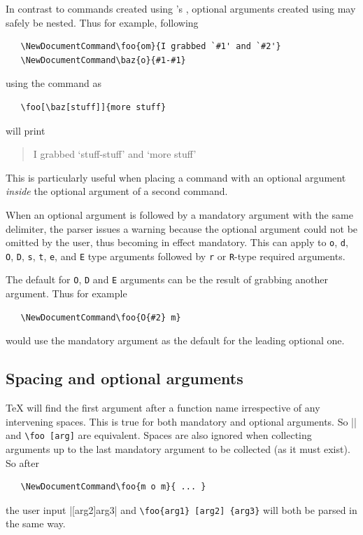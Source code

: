 \documentclass{ltxguide}
\begin{document}
In contrast to commands created using \LaTeXe{}'s , optional
arguments created using  may safely be nested. Thus for
example, following
\begin{verbatim}
   \NewDocumentCommand\foo{om}{I grabbed `#1' and `#2'}
   \NewDocumentCommand\baz{o}{#1-#1}
\end{verbatim}
using the command as
\begin{verbatim}
   \foo[\baz[stuff]]{more stuff}
\end{verbatim}
will print
\begin{quote}
I grabbed `stuff-stuff' and `more stuff'
\end{quote}
This is particularly useful when placing a command with an optional argument
\emph{inside} the optional argument of a second command.

When an optional argument is followed by a mandatory argument with the same
delimiter, the parser issues a warning because the optional argument could not
be omitted by the user, thus becoming in effect mandatory. This can apply to
\texttt{o}, \texttt{d}, \texttt{O}, \texttt{D}, \texttt{s}, \texttt{t},
\texttt{e}, and \texttt{E} type arguments followed by \texttt{r} or
\texttt{R}-type required arguments.

The default for \texttt{O}, \texttt{D} and \texttt{E} arguments can be
the result of grabbing another argument. Thus for example
\begin{verbatim}
   \NewDocumentCommand\foo{O{#2} m}
\end{verbatim}
would use the mandatory argument as the default for the leading optional
one.

\subsection{Spacing and optional arguments}
\label{sec:cmd:opt-space}

\TeX{} will find the first argument after a function name irrespective of any
intervening spaces. This is true for both mandatory and optional arguments. So
|\foo[arg]| and \verb*|\foo [arg]| are equivalent. Spaces are also ignored when
collecting arguments up to the last mandatory argument to be collected (as it
must exist). So after
\begin{verbatim}
   \NewDocumentCommand\foo{m o m}{ ... }
\end{verbatim}
the user input |[arg2]{arg3}| and \verb*|\foo{arg1} [arg2] {arg3}|
will both be parsed in the same way.
\end{document}
